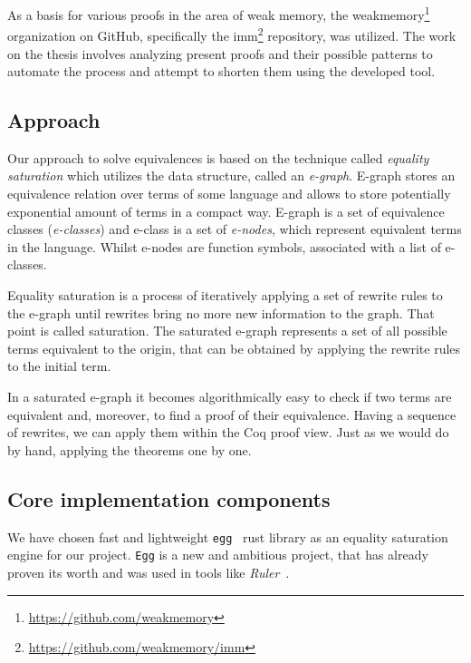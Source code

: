 As a basis for various proofs in the area of weak memory, the weakmemory\footnote{\href{https://github.com/weakmemory}{https://github.com/weakmemory}} organization on GitHub, specifically the imm\footnote{\href{https://github.com/weakmemory/imm}{https://github.com/weakmemory/imm}} repository, was utilized. The work on the thesis involves analyzing present proofs and their possible patterns to automate the process and attempt to shorten them using the developed tool.

\subsection{Approach}
Our approach to solve equivalences is based on the technique called \textit{equality saturation} which utilizes the data structure, called an \textit{e-graph}. E-graph stores an equivalence relation over terms of some language and allows to store potentially exponential amount of terms in a compact way. E-graph is a set of equivalence classes (\textit{e-classes}) and e-class is a set of \textit{e-nodes}, which represent equivalent terms in the language. Whilst e-nodes are function symbols, associated with a list of e-classes. 

Equality saturation is a process of iteratively applying a set of rewrite rules to the e-graph until rewrites bring no more new information to the graph. That point is called saturation. The saturated e-graph represents a set of all possible terms  equivalent to the origin, that can be obtained by applying the rewrite rules to the initial term.

In a saturated e-graph it becomes algorithmically easy to check if two terms are equivalent and, moreover, to find a proof of their equivalence. Having a sequence of rewrites, we can apply them within the Coq proof view. Just as we would do by hand, applying the theorems one by one.

\subsection{Core implementation components}

We have chosen fast and lightweight \texttt{egg}~\cite{egg} rust library as an equality saturation engine for our project. \texttt{Egg} is a new and ambitious project, that has already proven its worth and was used in tools like \textit{Ruler}~\cite{ruler}. 

